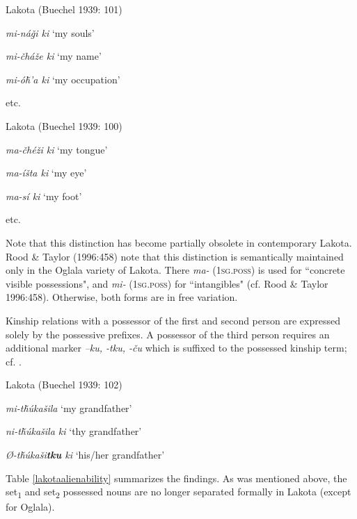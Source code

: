 \documentclass[output=paper]{LSP/langsci}
\begin{document}
\ea Lakota (Buechel 1939: 101) \label{lakotaincorporeal}

\textit{mi-ná\v{g}i ki } \hspace{2.1em}		`my souls'

\textit{mi-\v{c}há\v{z}e  ki } \hspace{1.9em} `my name'

\textit{mi-ó\v{h}'a ki}	\hspace{2em}		`my occupation'

etc.

\ex Lakota (Buechel 1939: 100) \label{lakotabody}

\textit{ma-\v{c}hé\v{z}i ki } \hspace{1.7em}	`my tongue'

\textit{ma-íšta ki }	 \hspace{2.1em}	`my eye'

\textit{ma-sí ki }		 \hspace{3em}	`my foot'

etc.
\z

Note that this distinction has become partially obsolete in contemporary Lakota. Rood \& Taylor (1996:458) note that this distinction is semantically maintained only in the Oglala variety of Lakota. There \textit{ma-} (\textsc{1sg.poss}) is used for ``concrete visible possessions", and \textit{mi-} (\textsc{1sg.poss}) for ``intangibles" (cf. Rood \& Taylor 1996:458). Otherwise, both forms are in free variation.

Kinship relations with a possessor of the first and second person are expressed solely by the possessive prefixes. A possessor of the third person requires an additional marker \textit{–ku, -tku, -\v{c}u} which is suffixed to the possessed kinship term; cf. .

\ea	Lakota (Buechel 1939: 102) \label{lakotamygrandfather}

\textit{mi-t\v{h}\'ukašila} \hspace{3.6em}		`my grandfather'
 
\textit{ni-t\v{h}\'ukašila ki } \hspace{2.3em}	`thy grandfather'

\textit{Ø-t\v{h}\'ukaši\textbf{tku} ki }	\hspace{1.8em} `his/her grandfather'
\z

Table \ref{lakotaalienability} summarizes the findings. As was mentioned above, the set\textsubscript{1} and set\textsubscript{2} possessed nouns are no longer separated formally in Lakota (except for Oglala).
\end{document}
